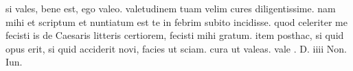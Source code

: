 


si vales, bene est, ego valeo. valetudinem tuam velim cures diligentissime. nam mihi et scriptum et nuntiatum est te in febrim subito incidisse. quod celeriter me fecisti is de Caesaris litteris certiorem, fecisti mihi gratum. item posthac, si quid opus erit, si quid acciderit novi, facies ut sciam. cura ut valeas. vale . D. iiii Non. Iun.
